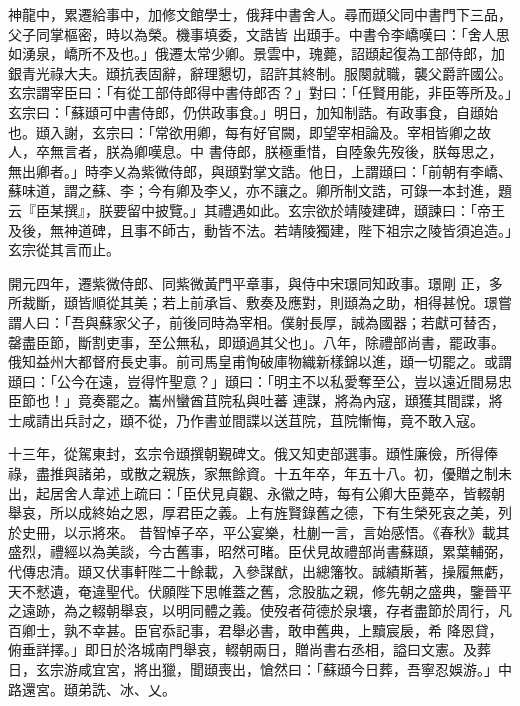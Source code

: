 \begin{pinyinscope}
 神龍中，累遷給事中，加修文館學士，俄拜中書舍人。尋而頲父同中書門下三品，父子同掌樞密，時以為榮。機事填委，文誥皆
 出頲手。中書令李嶠嘆曰：「舍人思如湧泉，嶠所不及也。」俄遷太常少卿。景雲中，瑰薨，詔頲起復為工部侍郎，加銀青光祿大夫。頲抗表固辭，辭理懇切，詔許其終制。服闋就職，襲父爵許國公。玄宗謂宰臣曰：「有從工部侍郎得中書侍郎否？」對曰：「任賢用能，非臣等所及。」玄宗曰：「蘇頲可中書侍郎，仍供政事食。」明日，加知制誥。有政事食，自頲始也。頲入謝，玄宗曰：「常欲用卿，每有好官闕，即望宰相論及。宰相皆卿之故人，卒無言者，朕為卿嘆息。中
 書侍郎，朕極重惜，自陸象先歿後，朕每思之，無出卿者。」時李乂為紫微侍郎，與頲對掌文誥。他日，上謂頲曰：「前朝有李嶠、蘇味道，謂之蘇、李；今有卿及李乂，亦不讓之。卿所制文誥，可錄一本封進，題云『臣某撰』，朕要留中披覽。」其禮遇如此。玄宗欲於靖陵建碑，頲諫曰：「帝王及後，無神道碑，且事不師古，動皆不法。若靖陵獨建，陛下祖宗之陵皆須追造。」玄宗從其言而止。



 開元四年，遷紫微侍郎、同紫微黃門平章事，與侍中宋璟同知政事。璟剛
 正，多所裁斷，頲皆順從其美；若上前承旨、敷奏及應對，則頲為之助，相得甚悅。璟嘗謂人曰：「吾與蘇家父子，前後同時為宰相。僕射長厚，誠為國器；若獻可替否，罄盡臣節，斷割吏事，至公無私，即頲過其父也」。八年，除禮部尚書，罷政事。俄知益州大都督府長史事。前司馬皇甫恂破庫物織新樣錦以進，頲一切罷之。或謂頲曰：「公今在遠，豈得忤聖意？」頲曰：「明主不以私愛奪至公，豈以遠近間易忠臣節也！」竟奏罷之。巂州蠻酋苴院私與吐蕃
 連謀，將為內寇，頲獲其間諜，將士咸請出兵討之，頲不從，乃作書並間諜以送苴院，苴院慚悔，竟不敢入寇。



 十三年，從駕東封，玄宗令頲撰朝覲碑文。俄又知吏部選事。頲性廉儉，所得俸祿，盡推與諸弟，或散之親族，家無餘資。十五年卒，年五十八。初，優贈之制未出，起居舍人韋述上疏曰：「臣伏見貞觀、永徽之時，每有公卿大臣薨卒，皆輟朝舉哀，所以成終始之恩，厚君臣之義。上有旌賢錄舊之德，下有生榮死哀之美，列於史冊，以示將來。
 昔智悼子卒，平公宴樂，杜蒯一言，言始感悟。《春秋》載其盛烈，禮經以為美談，今古舊事，昭然可睹。臣伏見故禮部尚書蘇頲，累葉輔弼，代傳忠清。頲又伏事軒陛二十餘載，入參謀猷，出總籓牧。誠績斯著，操履無虧，天不憖遺，奄違聖代。伏願陛下思帷蓋之舊，念股肱之親，修先朝之盛典，鑒晉平之遠跡，為之輟朝舉哀，以明同體之義。使歿者荷德於泉壤，存者盡節於周行，凡百卿士，孰不幸甚。臣官忝記事，君舉必書，敢申舊典，上黷宸扆，希
 降恩貸，俯垂詳擇。」即日於洛城南門舉哀，輟朝兩日，贈尚書右丞相，謚曰文憲。及葬日，玄宗游咸宜宮，將出獵，聞頲喪出，愴然曰：「蘇頲今日葬，吾寧忍娛游。」中路還宮。頲弟詵、冰、乂。




\end{pinyinscope}
